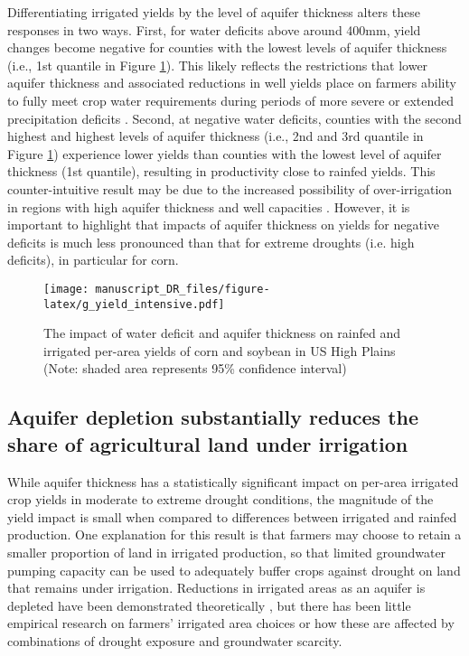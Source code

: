\documentclass[
]{article}
\begin{document}
Differentiating irrigated yields by the level of aquifer thickness alters these responses in two ways. First, for water deficits above around 400mm, yield changes become negative for counties with the lowest levels of aquifer thickness (i.e., 1st quantile in Figure \ref{fig:yield-response}). This likely reflects the restrictions that lower aquifer thickness and associated reductions in well yields place on farmers ability to fully meet crop water requirements during periods of more severe or extended precipitation deficits \citep{rad2020effects, foster2014modeling, hrozencik2017heterogeneous}. Second, at negative water deficits, counties with the second highest and highest levels of aquifer thickness (i.e., 2nd and 3rd quantile in Figure \ref{fig:yield-response}) experience lower yields than counties with the lowest level of aquifer thickness (1st quantile), resulting in productivity close to rainfed yields. This counter-intuitive result may be due to the increased possibility of over-irrigation in regions with high aquifer thickness and well capacities \citep{foster2019assessing,gibson2017case,gibson2019benchmarking}. However, it is important to highlight that impacts of aquifer thickness on yields for negative deficits is much less pronounced than that for extreme droughts (i.e. high deficits), in particular for corn.

\begin{figure}

{\centering \texttt{[image: manuscript\_DR\_files/figure-latex/g\_yield\_intensive.pdf]} 

}

\caption{The impact of water deficit and aquifer thickness on rainfed and irrigated per-area yields of corn and soybean in US High Plains (Note: shaded area represents 95\% confidence interval)}\label{fig:yield-response}
\end{figure}

\hypertarget{the-impact-of-saturated-thickness-on-the-share-of-irrigated-production}{%
\subsection{Aquifer depletion substantially reduces the share of agricultural land under irrigation}\label{the-impact-of-saturated-thickness-on-the-share-of-irrigated-production}}

While aquifer thickness has a statistically significant impact on per-area irrigated crop yields in moderate to extreme drought conditions, the magnitude of the yield impact is small when compared to differences between irrigated and rainfed production. One explanation for this result is that farmers may choose to retain a smaller proportion of land in irrigated production, so that limited groundwater pumping capacity can be used to adequately buffer crops against drought on land that remains under irrigation. Reductions in irrigated areas as an aquifer is depleted have been demonstrated theoretically \citep{rad2020effects, foster2014modeling, hrozencik2017heterogeneous,deines2020transitions}, but there has been little empirical research on farmers' irrigated area choices or how these are affected by combinations of drought exposure and groundwater scarcity. 
\end{document}
